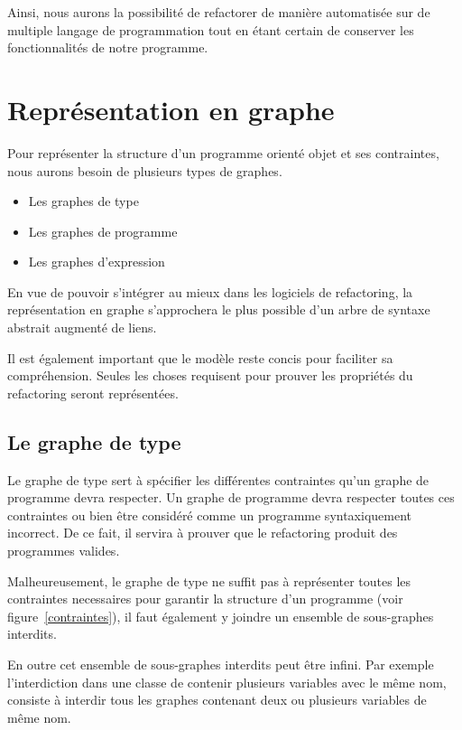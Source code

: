 \documentclass[a4paper, 12pt]{article}
\begin{document}
  Ainsi, nous aurons la possibilité de refactorer de manière automatisée sur de multiple langage de programmation tout en étant certain de conserver les fonctionnalités de notre programme.

  \newpage

  \section{Représentation en graphe}
  Pour représenter la structure d'un programme orienté objet et ses contraintes, nous aurons besoin de plusieurs types de graphes.

  \begin{itemize}[label=\textbullet]
    \item Les graphes de type
    \item Les graphes de programme
    \item Les graphes d'expression
  \end{itemize}

  En vue de pouvoir s'intégrer au mieux dans les logiciels de refactoring, la représentation en graphe s'approchera le plus possible d'un arbre de syntaxe abstrait augmenté de liens.

  Il est également important que le modèle reste concis pour faciliter sa compréhension. Seules les choses requisent pour prouver les propriétés du refactoring seront représentées.

  \subsection{Le graphe de type}

  Le graphe de type sert à spécifier les différentes contraintes qu'un graphe de programme devra respecter.
  Un graphe de programme devra respecter toutes ces contraintes ou bien être considéré comme un programme syntaxiquement incorrect.
  De ce fait, il servira à prouver que le refactoring produit des programmes valides.

  Malheureusement, le graphe de type ne suffit pas à représenter toutes les contraintes necessaires pour garantir la structure d'un programme (voir figure~\ref{contraintes}),
  il faut également y joindre un ensemble de sous-graphes interdits.

  En outre cet ensemble de sous-graphes interdits peut être infini. Par exemple l'interdiction dans une classe de contenir plusieurs variables avec le même nom,
  consiste à interdir tous les graphes contenant deux ou plusieurs variables de même nom.
\end{document}
